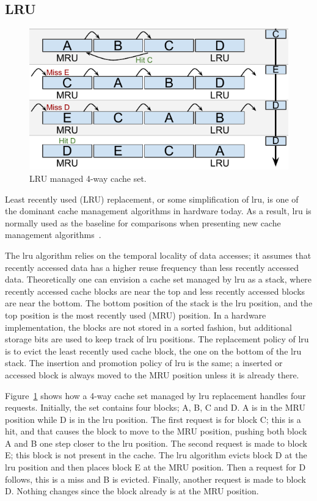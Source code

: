 
\subsection{LRU}
\label{sec:algorithms:lru}

\begin{figure}[ht]
    \centering
    \includegraphics[width=.65\textwidth]{figures/algorithms/LRU}
    \caption{LRU managed 4-way cache set.}
    \label{fig:algorithms:lru_example}
\end{figure}

\noindent
Least recently used (LRU) replacement, or some simplification of \gls{lru}, is one of the dominant cache management algorithms in hardware today. 
As a result, \gls{lru} is normally used as the baseline for comparisons when presenting new cache management algorithms~\cite{Jaleel2010,Qureshi2006,Qureshi2007}.

The \gls{lru} algorithm relies on the temporal locality of data accesses; it assumes that recently accessed data has a higher reuse frequency than less recently accessed data.
Theoretically one can envision a cache set managed by \gls{lru} as a stack, where recently accessed cache blocks are near the top and less recently accessed blocks are near the bottom.
The bottom position of the stack is the \gls{lru} position, and the top position is the most recently used (MRU) position.
In a hardware implementation, the blocks are not stored in a sorted fashion, but additional storage bits are used to keep track of \gls{lru} positions.
The replacement policy of \gls{lru} is to evict the least recently used cache block, the one on the bottom of the \gls{lru} stack.
The insertion and promotion policy of \gls{lru} is the same; a inserted or accessed block is always moved to the MRU position unless it is already there.

Figure~\ref{fig:algorithms:lru_example} shows how a 4-way cache set managed by \gls{lru} replacement handles four requests. 
Initially, the set contains four blocks; A, B, C and D. 
A is in the MRU position while D is in the \gls{lru} position.
The first request is for block C; this is a hit, and that causes the block to move to the MRU position, pushing both block A and B one step closer to the \gls{lru} position.
The second request is made to block E; this block is not present in the cache.
The \gls{lru} algorithm evicts block D at the \gls{lru} position and then places block E at the MRU position.
Then a request for D follows, this is a miss and B is evicted.
Finally, another request is made to block D. Nothing changes since the block already is at the MRU position.

